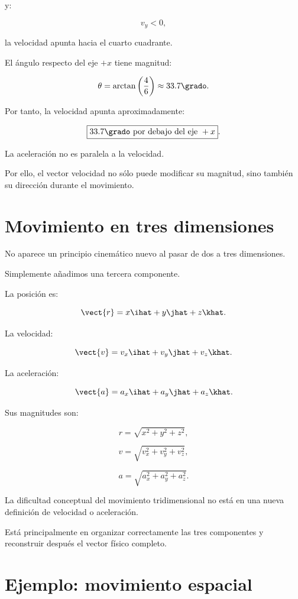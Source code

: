 y:

\[
v_y<0,
\]

la velocidad apunta hacia el cuarto cuadrante.

El ángulo respecto del eje \(+x\) tiene magnitud:

\[
\theta
=
\arctan\left(\frac{4}{6}\right)
\approx
33.7\grado.
\]

Por tanto, la velocidad apunta aproximadamente:

\[
\boxed{
33.7\grado
\text{ por debajo del eje }+x
}.
\]

\begin{interpretacion}
La aceleración no es paralela a la velocidad.

Por ello, el vector velocidad no sólo puede modificar su magnitud, sino también
su dirección durante el movimiento.
\end{interpretacion}


\section{Movimiento en tres dimensiones}

No aparece un principio cinemático nuevo al pasar de dos a tres dimensiones.

Simplemente añadimos una tercera componente.

La posición es:

\[
\vect{r}
=
x\ihat+y\jhat+z\khat.
\]

La velocidad:

\[
\vect{v}
=
v_x\ihat+v_y\jhat+v_z\khat.
\]

La aceleración:

\[
\vect{a}
=
a_x\ihat+a_y\jhat+a_z\khat.
\]

Sus magnitudes son:

\[
r
=
\sqrt{x^2+y^2+z^2},
\]

\[
v
=
\sqrt{v_x^2+v_y^2+v_z^2},
\]

\[
a
=
\sqrt{a_x^2+a_y^2+a_z^2}.
\]

\begin{interpretacion}
La dificultad conceptual del movimiento tridimensional no está en una nueva
definición de velocidad o aceleración.

Está principalmente en organizar correctamente las tres componentes y
reconstruir después el vector físico completo.
\end{interpretacion}


\section{Ejemplo: movimiento espacial}

